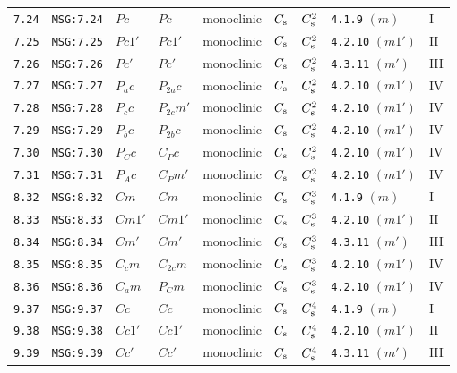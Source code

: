 \documentclass[fleqn,10pt]{jsarticle}
\begin{document}
\begin{center}
\begin{longtable}{lllllllll}
\texttt{7.24} & \texttt{MSG:7.24} & $Pc$ & $Pc$ & monoclinic & $C_{\rm s}$ & $C_{\rm s}^{2}$ & \texttt{4.1.9} $(m)$ & I \\
\texttt{7.25} & \texttt{MSG:7.25} & $Pc1'$ & $Pc1'$ & monoclinic & $C_{\rm s}$ & $C_{\rm s}^{2}$ & \texttt{4.2.10} $(m1')$ & II \\
\texttt{7.26} & \texttt{MSG:7.26} & $Pc'$ & $Pc'$ & monoclinic & $C_{\rm s}$ & $C_{\rm s}^{2}$ & \texttt{4.3.11} $(m')$ & III \\
\texttt{7.27} & \texttt{MSG:7.27} & $P_{a}c$ & $P_{2a}c$ & monoclinic & $C_{\rm s}$ & $C_{\rm s}^{2}$ & \texttt{4.2.10} $(m1')$ & IV \\
\texttt{7.28} & \texttt{MSG:7.28} & $P_{c}c$ & $P_{2c}m'$ & monoclinic & $C_{\rm s}$ & $C_{\rm s}^{2}$ & \texttt{4.2.10} $(m1')$ & IV \\
\texttt{7.29} & \texttt{MSG:7.29} & $P_{b}c$ & $P_{2b}c$ & monoclinic & $C_{\rm s}$ & $C_{\rm s}^{2}$ & \texttt{4.2.10} $(m1')$ & IV \\
\texttt{7.30} & \texttt{MSG:7.30} & $P_{C}c$ & $C_{P}c$ & monoclinic & $C_{\rm s}$ & $C_{\rm s}^{2}$ & \texttt{4.2.10} $(m1')$ & IV \\
\texttt{7.31} & \texttt{MSG:7.31} & $P_{A}c$ & $C_{P}m'$ & monoclinic & $C_{\rm s}$ & $C_{\rm s}^{2}$ & \texttt{4.2.10} $(m1')$ & IV \\ \hline
\texttt{8.32} & \texttt{MSG:8.32} & $Cm$ & $Cm$ & monoclinic & $C_{\rm s}$ & $C_{\rm s}^{3}$ & \texttt{4.1.9} $(m)$ & I \\
\texttt{8.33} & \texttt{MSG:8.33} & $Cm1'$ & $Cm1'$ & monoclinic & $C_{\rm s}$ & $C_{\rm s}^{3}$ & \texttt{4.2.10} $(m1')$ & II \\
\texttt{8.34} & \texttt{MSG:8.34} & $Cm'$ & $Cm'$ & monoclinic & $C_{\rm s}$ & $C_{\rm s}^{3}$ & \texttt{4.3.11} $(m')$ & III \\
\texttt{8.35} & \texttt{MSG:8.35} & $C_{c}m$ & $C_{2c}m$ & monoclinic & $C_{\rm s}$ & $C_{\rm s}^{3}$ & \texttt{4.2.10} $(m1')$ & IV \\
\texttt{8.36} & \texttt{MSG:8.36} & $C_{a}m$ & $P_{C}m$ & monoclinic & $C_{\rm s}$ & $C_{\rm s}^{3}$ & \texttt{4.2.10} $(m1')$ & IV \\ \hline
\texttt{9.37} & \texttt{MSG:9.37} & $Cc$ & $Cc$ & monoclinic & $C_{\rm s}$ & $C_{\rm s}^{4}$ & \texttt{4.1.9} $(m)$ & I \\
\texttt{9.38} & \texttt{MSG:9.38} & $Cc1'$ & $Cc1'$ & monoclinic & $C_{\rm s}$ & $C_{\rm s}^{4}$ & \texttt{4.2.10} $(m1')$ & II \\
\texttt{9.39} & \texttt{MSG:9.39} & $Cc'$ & $Cc'$ & monoclinic & $C_{\rm s}$ & $C_{\rm s}^{4}$ & \texttt{4.3.11} $(m')$ & III \\

\end{longtable}
\end{center}
\end{document}
